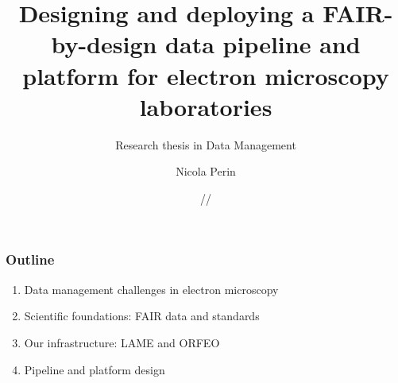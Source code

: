 \documentclass{beamer}
\title[FAIR-by-design EM pipeline]{Designing and deploying a FAIR-by-design data pipeline and platform for electron microscopy laboratories}
\subtitle{Research thesis in Data Management}
\institute{University of Trieste}
\author[Nicola Perin]{Nicola Perin}
\date{\the\day/\the\month/\the\year}
\begin{document}
	\begin{frame}
		\setTitlestyleDissertation
		\maketitle
	\end{frame}
	
	\begin{frame}
		\frametitle{Outline}
		\large
		\begin{enumerate}
			\item Data management challenges in electron microscopy
			\item Scientific foundations: FAIR data and standards
			\item Our infrastructure: LAME and ORFEO
			\item Pipeline and platform design
		\end{enumerate}
	\end{frame}
	
\end{document}

